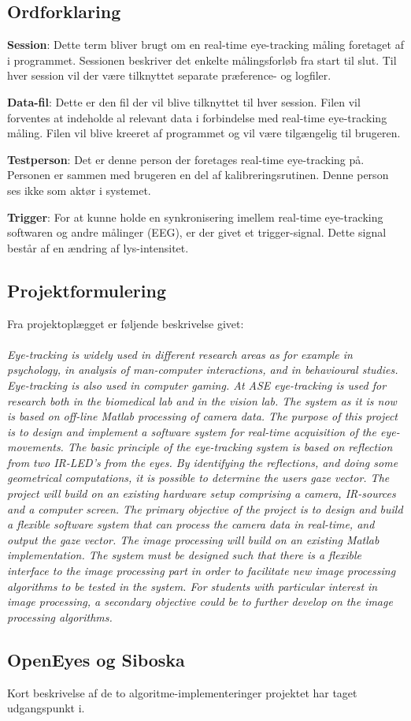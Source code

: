 \documentclass[rapport.tex]{subfiles}
\begin{document}
	\subsection{Ordforklaring}
		\item \textbf{Session}: Dette term bliver brugt om en real-time eye-tracking måling foretaget af i programmet. Sessionen beskriver det enkelte målingsforløb fra start til slut. Til hver session vil der være tilknyttet separate præference- og logfiler. 
		\item \textbf{Data-fil}: Dette er den fil der vil blive tilknyttet til hver session. Filen vil forventes at indeholde al relevant data i forbindelse med real-time eye-tracking måling. Filen vil blive kreeret af programmet og vil være tilgængelig til brugeren. 
		\item \textbf{Testperson}: Det er denne person der foretages real-time eye-tracking på. Personen er sammen med brugeren en del af kalibreringsrutinen. Denne person ses ikke som aktør i systemet. 
		\item \textbf{Trigger}: For at kunne holde en synkronisering imellem real-time eye-tracking softwaren og andre målinger (EEG), er der givet et trigger-signal. Dette signal består af en ændring af lys-intensitet. 
	\subsection{Projektformulering}
	Fra projektoplægget er føljende beskrivelse givet:\\
	\\
\textit{	Eye-tracking is widely used in different research areas as for example in psychology, in analysis of man-computer interactions, and in behavioural studies. Eye-tracking is also used in computer gaming. At ASE eye-tracking is used for research both in the biomedical lab and in the vision lab. The system as it is now is based on off-line Matlab processing of camera data. The purpose of this project is to design and implement a software system for real-time acquisition of the eye-movements. The basic principle of the eye-tracking system is based on reflection from two IR-LED’s from the eyes. By identifying the reflections, and doing some geometrical computations, it is possible to determine the users gaze vector. 
	The project will build on an existing hardware setup comprising a camera, IR-sources and a computer screen. The primary objective of the project is to design and build a flexible software system that can process the camera data in real-time, and output the gaze vector. The image processing will build on an existing Matlab implementation. The system must be designed such that there is a flexible interface to the image processing part in order to facilitate new image processing algorithms to be tested in the system. For students with particular interest in image processing, a secondary objective could be to further develop on the image processing algorithms.} 
	\\
	
	\subsection{OpenEyes og Siboska}
	Kort beskrivelse af de to algoritme-implementeringer projektet har taget udgangspunkt i.	
	
		
\end{document}
